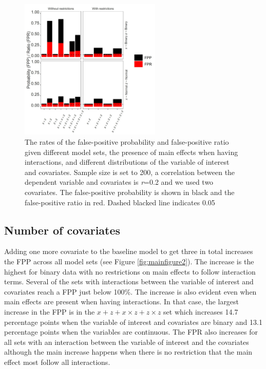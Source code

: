 \begin{figure}[hbt!]
\includegraphics[width=0.6\textwidth]{R/Analysis/Result/Figures/Figure1A.jpeg}
\centering
\caption{The rates of the false-positive probability and false-positive ratio given different model sets, the presence of main effects when having interactions, and different distributions of the variable of interest and covariates. Sample size is set to 200, a correlation between the dependent variable and covariates is \textit{r}=0.2 and we used two covariates. The false-positive probability is shown in black and the false-positive ratio in red. Dashed blacked line indicates 0.05}
\label{fig:mainfigure1}
\end{figure}

\subsection{Number of covariates}
Adding one more covariate to the baseline model to get three in total increases the FPP across all model sets (see Figure \ref{fig:mainfigure2}). The increase is the highest for binary data with no restrictions on main effects to follow interaction terms. Several of the sets with interactions between the variable of interest and covariates reach a FPP just below 100\%. The increase is also evident even when main effects are present when having interactions. In that case, the largest increase in the FPP is in the $x + z+ x \times z + z \times z$ set which increases 14.7 percentage points when the variable of interest and covariates are binary and 13.1 percentage points when the variables are continuous. The FPR also increases for all sets with an interaction between the variable of interest and the covariates although the main increase happens when there is no restriction that the main effect most follow all interactions.


